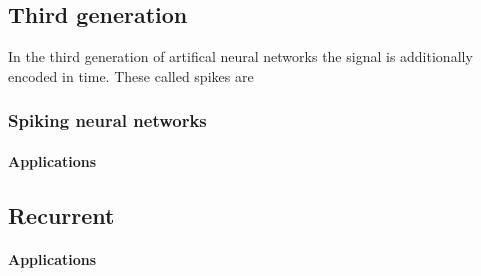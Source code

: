 \documentclass[10pt,a4paper,DIV=11]{scrreprt}
\begin{document}
\subsection{Third generation}
In the third generation of artifical neural networks the signal is additionally encoded in time. These called spikes are

\subsubsection{Spiking neural networks}

\paragraph{Applications}

\subsection{Recurrent}

\paragraph{Applications}



\end{document}
